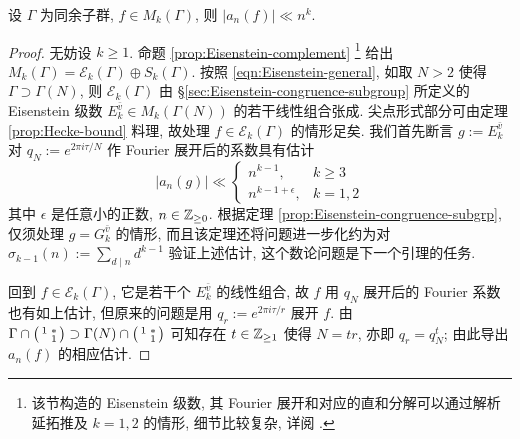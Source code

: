 \begin{theorem}\label{prop:Hecke-bound-cong}
	设 $\Gamma$ 为同余子群, $f \in M_k(\Gamma)$, 则 $|a_n(f)| \ll n^k$.
\end{theorem}
\begin{proof}
	无妨设 $k \geq 1$. 命题 \ref{prop:Eisenstein-complement} \footnote{该节构造的 Eisenstein 级数, 其 Fourier 展开和对应的直和分解可以通过解析延拓推及 $k = 1, 2$ 的情形, 细节比较复杂, 详阅 \cite[\S 7.2]{Mi89}.}
	给出 $M_k(\Gamma) = \mathcal{E}_k(\Gamma) \oplus S_k(\Gamma)$. 按照 \eqref{eqn:Eisenstein-general}, 如取 $N > 2$ 使得 $\Gamma \supset \Gamma(N)$, 则 $\mathcal{E}_k(\Gamma)$ 由 \S\ref{sec:Eisenstein-congruence-subgroup} 所定义的 Eisenstein 级数 $E_k^{\bar{v}} \in M_k(\Gamma(N))$ 的若干线性组合张成. 尖点形式部分可由定理 \ref{prop:Hecke-bound} 料理, 故处理 $f \in \mathcal{E}_k(\Gamma)$ 的情形足矣. 我们首先断言 $g := E_k^{\bar{v}}$ 对 $q_N := e^{2\pi i\tau/N}$ 作 Fourier 展开后的系数具有估计
	\[ |a_n(g)| \ll \begin{cases}
		n^{k-1}, & k \geq 3 \\
		n^{k-1+\epsilon}, & k =1,2
	\end{cases} \]
	其中 $\epsilon$ 是任意小的正数, $n \in \mathbb{Z}_{\geq 0}$. 根据定理 \ref{prop:Eisenstein-congruence-subgrp}, 仅须处理 $g = G_k^{\bar{v}}$ 的情形, 而且该定理还将问题进一步化约为对 $\sigma_{k-1}(n) := \sum_{d \mid n} d^{k-1}$ 验证上述估计, 这个数论问题是下一个引理的任务.
	
	回到 $f \in \mathcal{E}_k(\Gamma)$, 它是若干个 $E_k^{\bar{v}}$ 的线性组合, 故 $f$ 用 $q_N$ 展开后的 Fourier 系数也有如上估计, 但原来的问题是用 $q_r := e^{2\pi i\tau/r}$ 展开 $f$. 由 $\Gamma \cap \bigl(\begin{smallmatrix} 1 & * \\  & 1 \end{smallmatrix}\bigr) \supset \Gamma(N) \cap \bigl(\begin{smallmatrix} 1 & * \\  & 1 \end{smallmatrix}\bigr)$ 可知存在 $t \in \mathbb{Z}_{\geq 1}$ 使得 $N = tr$, 亦即 $q_r = q_N^t$; 由此导出 $a_n(f)$ 的相应估计.
\end{proof}

